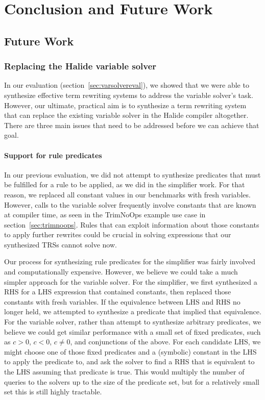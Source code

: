\chapter{Conclusion and Future Work}
\label{chapter:conclusion}



\section{Future Work}

\subsection{Replacing the Halide variable solver}
\label{sec:varsolverreplacement}

In our evaluation (section~\ref{sec:varsolvereval}), we showed that we were able to synthesize effective term rewriting systems to address the variable solver's task. However, our ultimate, practical aim is to synthesize a term rewriting system that can replace the existing variable solver in the Halide compiler altogether. There are three main issues that need to be addressed before we can achieve that goal.

\subsubsection{Support for rule predicates}
In our previous evaluation, we did not attempt to synthesize predicates that must be fulfilled for a rule to be applied, as we did in the simplifier work. For that reason, we replaced all constant values in our benchmarks with fresh variables. However, calls to the variable solver frequently involve constants that are known at compiler time, as seen in the TrimNoOps example use case in section~\ref{sec:trimnoops}. Rules that can exploit information about those constants to apply further rewrites could be crucial in solving expressions that our synthesized TRSs cannot solve now.

Our process for synthesizing rule predicates for the simplifier was fairly involved and computationally expensive. However, we believe we could take a much simpler approach for the variable solver. For the simplifier, we first synthesized a RHS for a LHS expression that contained constants, then replaced those constants with fresh variables. If the equivalence between LHS and RHS no longer held, we attempted to synthesize a predicate that implied that equivalence. For the variable solver, rather than attempt to synthesize arbitrary predicates, we believe we could get similar performance with a small set of fixed predicates, such as $c > 0$, $c < 0$, $c \neq 0$, and conjunctions of the above. For each candidate LHS, we might choose one of those fixed predicates and a (symbolic) constant in the LHS to apply the predicate to, and ask the solver to find a RHS that is equivalent to the LHS assuming that predicate is true. This would multiply the number of queries to the solvers up to the size of the predicate set, but for a relatively small set this is still highly tractable.


